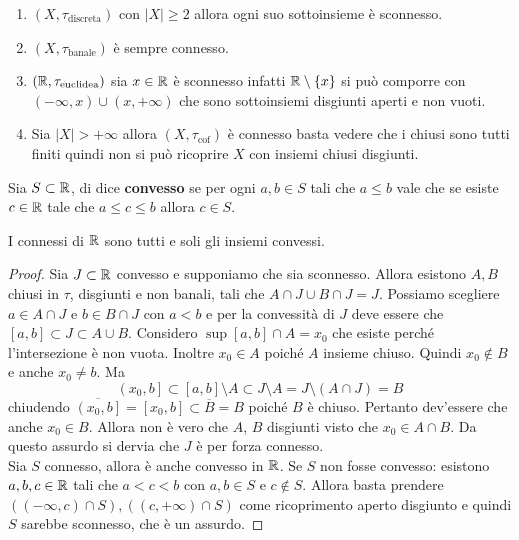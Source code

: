\begin{example}
\begin{enumerate}
	\item $(X, \tau_{\text{discreta}})$ con $|X| \ge 2$ allora ogni suo sottoinsieme è sconnesso. 
	\item $(X, \tau_{\text{banale}})$ è sempre connesso. 
	\item $(\mathbb{R}, \tau_{\text{euclidea}})$ sia $x \in \mathbb{R}$ è sconnesso infatti $\mathbb{R} \setminus \left\{x\right\}$ si può comporre con $(-\infty, x) \cup (x, +\infty)$ che sono sottoinsiemi disgiunti aperti e non vuoti. 
	\item Sia $|X| > + \infty$ allora $(X, \tau_{\text{cof}})$ è connesso basta vedere che i chiusi sono tutti finiti quindi non si può ricoprire $X$ con insiemi chiusi disgiunti. 
\end{enumerate}
\end{example}

\begin{definition}
	Sia $S \subset \mathbb{R}$, di dice \textbf{convesso} se per ogni $a, b\in S$ tali che $a \le b$ vale che se esiste $c\in \mathbb{R}$ tale che $a\le c\le b$ allora $c\in S$.
\end{definition} 

\begin{theorem}
	I connessi di $\mathbb{R}$ sono tutti e soli gli insiemi convessi. 
\end{theorem}
\begin{proof}
	Sia $J \subset \mathbb{R}$ convesso e supponiamo che sia sconnesso. Allora esistono $A, B$ chiusi in $\tau$, disgiunti e non banali, tali che $A \cap J \cup B \cap J = J$. Possiamo scegliere $a \in A \cap J$ e $b \in B \cap J$ con $a < b$ e per la convessità di $J$ deve essere che $\left[a,b\right] \subset J \subset A \cup B$. Considero $\sup \left[a,b\right] \cap A = x_0$ che esiste perché l'intersezione è non vuota. Inoltre $x_0 \in A$ poiché $A$ insieme chiuso. Quindi $x_0 \notin B$ e anche $x_0 \neq b$. Ma 
	\begin{equation*}
		\left(x_0, b\right] \subset \left[a,b\right] \setminus A \subset J \setminus A =  J \setminus (A \cap J) = B
	\end{equation*}
	chiudendo $\overline{\left(x_0, b\right]} = \left[x_0, b\right] \subset \overline{B} = B$ poiché $B$ è chiuso. Pertanto dev'essere che anche $x_0 \in B$. Allora non è vero che $A$, $B$ disgiunti visto che $x_0 \in A \cap B$. Da questo assurdo si dervia che $J$ è per forza connesso.\\
	
	Sia $S$ connesso, allora è anche convesso in $\mathbb{R}$. Se $S$ non fosse convesso: esistono $a,b,c \in \mathbb{R}$ tali che $a < c < b$ con $a,b \in S$ e $c \notin S$. Allora basta prendere $((-\infty, c) \cap S), ((c, +\infty) \cap S)$ come ricoprimento aperto disgiunto e quindi $S$ sarebbe sconnesso, che è un assurdo.
\end{proof}

